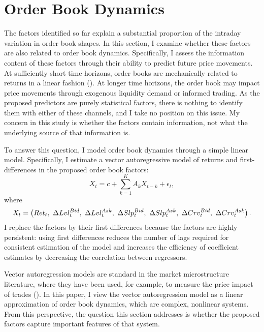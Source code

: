 \section{Order Book Dynamics}
	The factors identified so far explain a substantial proportion of the intraday variation in order book shapes. In this section, I examine whether these factors are also related to order book dynamics. Specifically, I assess the information content of these factors through their ability to predict future price movements. At sufficiently short time horizons, order books are mechanically related to returns in a linear fashion (\citet{Cont2013B}). At longer time horizons, the order book may impact price movements through exogenous liquidity demand or informed trading. As the proposed predictors are purely statistical factors, there is nothing to identify them with either of these channels, and I take no position on this issue. My concern in this study is whether the factors contain information, not what the underlying source of that information is.

	To answer this question, I model order book dynamics through a simple linear model. Specifically, I estimate a vector autoregressive model of returns and first-differences in the proposed order book factors:
	\begin{equation}
	\label{eqn:var}
	X_t = c + \sum_{k=1}^{K} A_k X_{t-k} + \epsilon_t,
	\end{equation}
	where
	\begin{equation}
	X_t = \left( Ret_t, \ \Delta Lvl_t^{Bid}, \ \Delta Lvl_t^{Ask}, \ \Delta Slp_t^{Bid}, \ \Delta Slp_t^{Ask}, \ \Delta Crv_t^{Bid}, \ \Delta Crv_t^{Ask} \right). \notag
	\end{equation}
	I replace the factors by their first differences because the factors are highly persistent: using first differences reduces the number of lags required for consistent estimation of the model and increases the efficiency of coefficient estimates by decreasing the correlation between regressors.

	Vector autoregression models are standard in the market microstructure literature, where they have been used, for example, to measure the price impact of trades (\citet{Hasbrouck1991}). In this paper, I view the vector autoregression model as a linear approximation of order book dynamics, which are complex, nonlinear systems. From this perspective, the question this section addresses is whether the proposed factors capture important features of that system.

